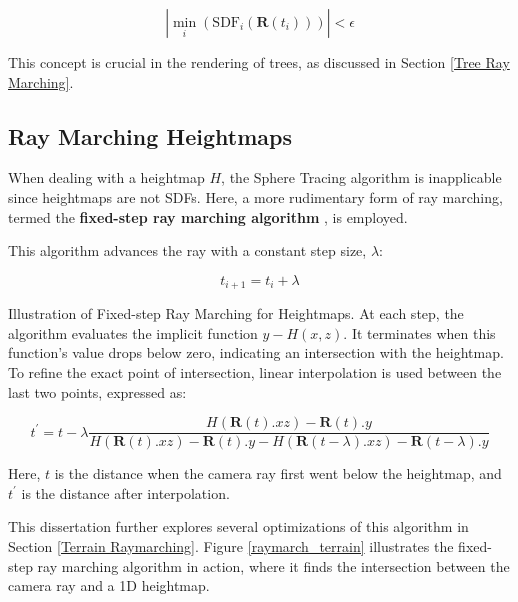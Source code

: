\begin{equation}
|\min_{i}(\text{SDF}_i(\mathbf{R}(t_i)))| < \epsilon 
\end{equation}

This concept is crucial in the rendering of trees, as discussed in Section \ref{Tree Ray Marching}.



\subsection{Ray Marching Heightmaps}
\label{Raymarching Heightmaps}

When dealing with a heightmap $H$, the Sphere Tracing algorithm is inapplicable since heightmaps are not SDFs. Here, a more rudimentary form of ray marching, termed the \textbf{fixed-step ray marching algorithm} \cite{quilez_raymarching_nodate}, is employed.



This algorithm advances the ray with a constant step size, $\lambda$:

\begin{equation}
    t_{i+1} = t_{i} + \lambda
\end{equation}

{Illustration of Fixed-step Ray Marching for Heightmaps.}{
At each step, the algorithm evaluates the implicit function $y-H(x,z)$. It terminates when this function's value drops below zero, indicating an intersection with the heightmap. To refine the exact point of intersection, linear interpolation is used between the last two points, expressed as:
}
\vspace{\baselineskip}

\begin{equation}
t^\prime = t - \lambda \frac{H(\mathbf{R}(t).xz) - \mathbf{R}(t).y}
    {H(\mathbf{R}(t).xz) - \mathbf{R}(t).y - H(\mathbf{R}(t - \lambda).xz) - \mathbf{R}(t - \lambda).y}
\end{equation}

Here, $t$ is the distance when the camera ray first went below the heightmap, and $t^\prime$ is the distance after interpolation.

This dissertation further explores several optimizations of this algorithm in Section \ref{Terrain Raymarching}. Figure \ref{raymarch_terrain} illustrates the fixed-step ray marching algorithm in action, where it finds the intersection between the camera ray and a 1D heightmap.




